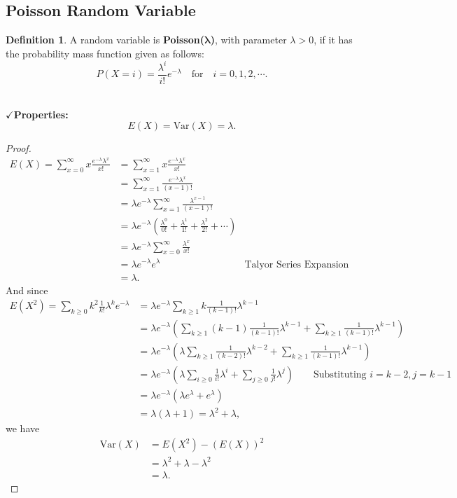 \documentclass[12pt,a4paper]{article}
\theoremstyle{definition}
\theoremstyle{definition}
\newtheorem*{definition}{Definition}
\theoremstyle{definition}
\theoremstyle{definition}
\theoremstyle{remark}
\theoremstyle{definition}
\newcommand{\Var}{\text{Var}}
\begin{document}
\subsection{Poisson Random Variable}
\begin{tcolorbox}[colback=white]
	\begin{definition}
		A random variable is \textbf{Poisson($\boldsymbol{\lambda}$)}, with parameter $\lambda>0$, if it has the probability mass function given as follows: \[
		P(X=i)=\frac{\lambda^i}{i!}e^{-\lambda}\quad\text{for}\quad i=0,1,2,\cdots.
		\]
	\end{definition}
\end{tcolorbox}\
\\
$\checkmark$\textbf{Properties:} \[
E(X)=\Var(X)=\lambda.
\]
\begin{proof}
	\begin{align*}
	E(X)=\sum_{x=0}^\infty x\frac{e^{-\lambda}\lambda^x}{x!}&=\sum_{x=1}^\infty x\frac{e^{-\lambda}\lambda^x}{x!}\\
	&=\sum_{x=1}^\infty \frac{e^{-\lambda}\lambda^x}{(x-1)!}\\
	&=\lambda e^{-\lambda}\sum_{x=1}^\infty\frac{\lambda^{x-1}}{(x-1)!}\\
	&=\lambda e^{-\lambda}\left(\frac{\lambda^0}{0!}+\frac{\lambda^1}{1!}+\frac{\lambda^2}{2!}+\cdots\right)\\
	&=\lambda e^{-\lambda}\sum_{x=0}^\infty\frac{\lambda^x}{x!}\\
	&=\lambda e^{-\lambda}e^\lambda &\text{Talyor Series Expansion for Exponential Function}\\
	&=\lambda.
	\end{align*} And since \begin{align*}
	E(X^2)=\sum_{k\geq 0}k^2\frac{1}{k!}\lambda^ke^{-\lambda}&=\lambda e^{-\lambda}\sum_{k\geq 1}k\frac{1}{(k-1)!}\lambda^{k-1} \\
	&=\lambda e^{-\lambda}\left(\sum_{k\geq 1}(k-1)\frac{1}{(k-1)!}\lambda^{k-1}+\sum_{k\geq1}\frac{1}{(k-1)!}\lambda^{k-1}\right)\\
	&=\lambda e^{-\lambda}\left(\lambda\sum_{k\geq 1}\frac{1}{(k-2)!}\lambda^{k-2}+\sum_{k\geq1}\frac{1}{(k-1)!}\lambda^{k-1}\right)\\
	&=\lambda e^{-\lambda}\left(\lambda\sum_{i\geq 0}\frac{1}{i!}\lambda^i+\sum_{j\geq 0}\frac{1}{j!}\lambda^j\right) \qquad\text{Substituting $i=k-2, j=k-1$}\\
	&=\lambda e^{-\lambda}(\lambda e^{\lambda}+e^\lambda)\\
	&=\lambda(\lambda+1)=\lambda^2+\lambda,
	\end{align*} we have \begin{align*}
	\Var(X)&=E(X^2)-(E(X))^2\\
	&=\lambda^2+\lambda-\lambda^2\\
	&=\lambda.
	\end{align*}
\end{proof}
\end{document}
